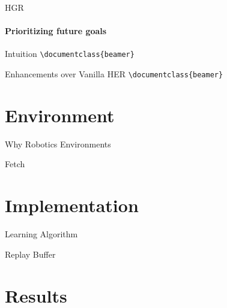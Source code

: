 \documentclass{beamer}
\begin{document}
      \begin{frame}[fragile]{HGR}
            \framesubtitle{Prioritizing future goals}
            \begin{block}{Intuition}
                  \verb|\documentclass{beamer}|\\
            \end{block}
            \begin{block}{Enhancements over Vanilla HER}
                  \verb|\documentclass{beamer}|\\
            \end{block}
      \end{frame}

\section{Environment}

      \begin{frame}{Why Robotics Environments}
            
      \end{frame}

      \begin{frame}{Fetch}

      \end{frame}

\section{Implementation}

      \begin{frame}{Learning Algorithm}
                  
      \end{frame}

      \begin{frame}{Replay Buffer}
                  
      \end{frame}


\section{Results}

\backmatter
\end{document}
